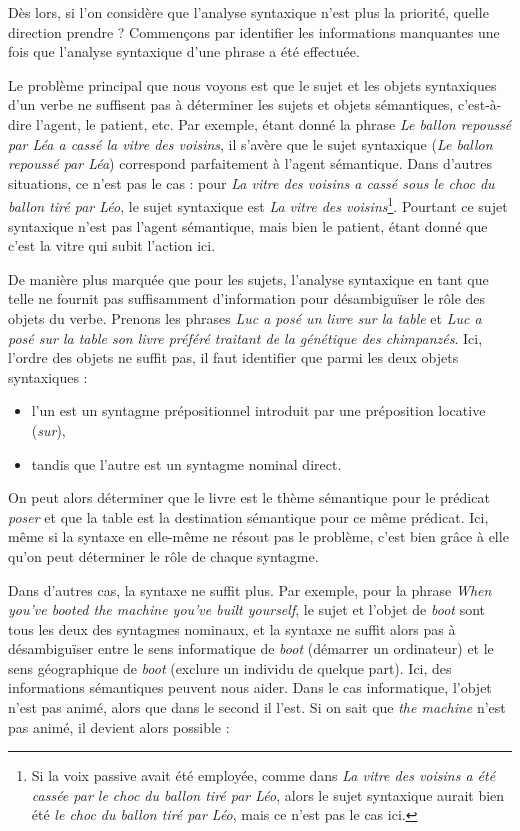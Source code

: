 Dès lors, si l'on considère que l'analyse syntaxique n'est plus la priorité,
quelle direction prendre ? Commençons par identifier les informations
manquantes une fois que l'analyse syntaxique d'une phrase a été effectuée.

Le problème principal que nous voyons est que le sujet et les objets
syntaxiques d'un verbe ne suffisent pas à déterminer les sujets et objets
sémantiques, c'est-à-dire l'agent, le patient, etc. Par exemple, étant donné la
phrase \textit{Le ballon repoussé par Léa a cassé la vitre des voisins}, il
s'avère que le sujet syntaxique (\textit{Le ballon repoussé par Léa})
correspond parfaitement à l'agent sémantique.  Dans d'autres situations, ce
n'est pas le cas : pour \textit{La vitre des voisins a cassé sous le choc du
ballon tiré par Léo}, le sujet syntaxique est \textit{La vitre des
voisins}\footnote{Si la voix passive avait été employée, comme dans \textit{La
    vitre des voisins a été cassée par le choc du ballon tiré par Léo}, alors
le sujet syntaxique aurait bien été \textit{le choc du ballon tiré par Léo},
mais ce n'est pas le cas ici.}. Pourtant ce sujet syntaxique n'est pas l'agent
sémantique, mais bien le patient, étant donné que c'est la vitre qui subit
l'action ici.

De manière plus marquée que pour les sujets, l'analyse syntaxique en tant que
telle ne fournit pas suffisamment d'information pour désambiguïser le rôle des
objets du verbe.  Prenons les phrases \textit{Luc a posé un livre sur la table}
et \textit{Luc a posé sur la table son livre préféré traitant de la génétique des
chimpanzés}.  Ici, l'ordre des objets ne suffit pas, il faut identifier que
parmi les deux objets syntaxiques :

\begin{itemize}
    \item l'un est un syntagme prépositionnel introduit par une préposition
        locative (\textit{sur}),
    \item tandis que l'autre est un syntagme nominal direct.
\end{itemize}

On peut alors déterminer que le livre est le thème sémantique pour le prédicat
\textit{poser} et que la table est la destination sémantique pour ce même
prédicat. Ici, même si la syntaxe en elle-même ne résout pas le problème, c'est
bien grâce à elle qu'on peut déterminer le rôle de chaque syntagme.

Dans d'autres cas, la syntaxe ne suffit plus. Par exemple, pour la phrase
\textit{When you've booted the machine you've built yourself}, le sujet et
l'objet de \textit{boot} sont tous les deux des syntagmes nominaux, et la
syntaxe ne suffit alors pas à désambiguïser entre le sens informatique de
\textit{boot} (démarrer un ordinateur) et le sens géographique de \textit{boot}
(exclure un individu de quelque part). Ici, des informations sémantiques
peuvent nous aider. Dans le cas informatique, l'objet n'est pas animé, alors
que dans le second il l'est. Si on sait que \textit{the machine} n'est pas
animé, il devient alors possible :

